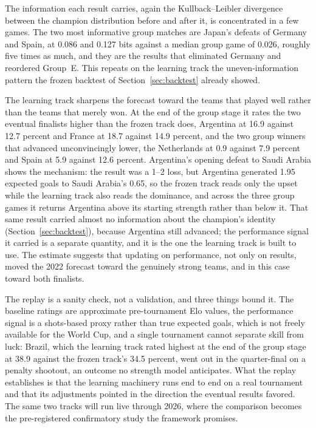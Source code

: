 \documentclass[11pt,letterpaper]{article}
\begin{document}
The information each result carries, again the Kullback--Leibler divergence between the champion distribution before and after it, is concentrated in a few games. The two most informative group matches are Japan's defeats of Germany and Spain, at 0.086 and 0.127 bits against a median group game of 0.026, roughly five times as much, and they are the results that eliminated Germany and reordered Group~E. This repeats on the learning track the uneven-information pattern the frozen backtest of Section~\ref{sec:backtest} already showed.

The learning track sharpens the forecast toward the teams that played well rather than the teams that merely won. At the end of the group stage it rates the two eventual finalists higher than the frozen track does, Argentina at 16.9 against 12.7 percent and France at 18.7 against 14.9 percent, and the two group winners that advanced unconvincingly lower, the Netherlands at 0.9 against 7.9 percent and Spain at 5.9 against 12.6 percent. Argentina's opening defeat to Saudi Arabia shows the mechanism: the result was a 1--2 loss, but Argentina generated 1.95 expected goals to Saudi Arabia's 0.65, so the frozen track reads only the upset while the learning track also reads the dominance, and across the three group games it returns Argentina above its starting strength rather than below it. That same result carried almost no information about the champion's identity (Section~\ref{sec:backtest}), because Argentina still advanced; the performance signal it carried is a separate quantity, and it is the one the learning track is built to use. The estimate suggests that updating on performance, not only on results, moved the 2022 forecast toward the genuinely strong teams, and in this case toward both finalists.

The replay is a sanity check, not a validation, and three things bound it. The baseline ratings are approximate pre-tournament Elo values, the performance signal is a shots-based proxy rather than true expected goals, which is not freely available for the World Cup, and a single tournament cannot separate skill from luck: Brazil, which the learning track rated highest at the end of the group stage at 38.9 against the frozen track's 34.5 percent, went out in the quarter-final on a penalty shootout, an outcome no strength model anticipates. What the replay establishes is that the learning machinery runs end to end on a real tournament and that its adjustments pointed in the direction the eventual results favored. The same two tracks will run live through 2026, where the comparison becomes the pre-registered confirmatory study the framework promises.
\end{document}
